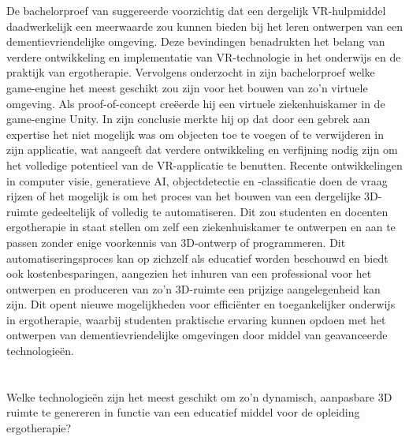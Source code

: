 De bachelorproef van \textcite{Raes2023} suggereerde voorzichtig dat een dergelijk VR-hulpmiddel daadwerkelijk een meerwaarde zou kunnen bieden bij het leren ontwerpen van een dementievriendelijke omgeving. Deze bevindingen benadrukten het belang van verdere ontwikkeling en implementatie van VR-technologie in het onderwijs en de praktijk van ergotherapie.
Vervolgens onderzocht \textcite{Neufkens2023} in zijn bachelorproef welke game-engine het meest geschikt zou zijn voor het bouwen van zo'n virtuele omgeving. Als proof-of-concept creëerde hij een virtuele ziekenhuiskamer in de game-engine Unity. In zijn conclusie merkte hij op dat door een gebrek aan expertise het niet mogelijk was om objecten toe te voegen of te verwijderen in zijn applicatie, wat aangeeft dat verdere ontwikkeling en verfijning nodig zijn om het volledige potentieel van de VR-applicatie te benutten.
Recente ontwikkelingen in computer visie, generatieve AI, objectdetectie en -classificatie doen de vraag rijzen of het mogelijk is om het proces van het bouwen van een dergelijke 3D-ruimte gedeeltelijk of volledig te automatiseren. Dit zou studenten en docenten ergotherapie in staat stellen om zelf een ziekenhuiskamer te ontwerpen en aan te passen zonder enige voorkennis van 3D-ontwerp of programmeren. Dit automatiseringsproces kan op zichzelf als educatief worden beschouwd en biedt ook kostenbesparingen, aangezien het inhuren van een professional voor het ontwerpen en produceren van zo'n 3D-ruimte een prijzige aangelegenheid kan zijn. Dit opent nieuwe mogelijkheden voor efficiënter en toegankelijker onderwijs in ergotherapie, waarbij studenten praktische ervaring kunnen opdoen met het ontwerpen van dementievriendelijke omgevingen door middel van geavanceerde technologieën.


\section{}%
\label{sec:onderzoeksvraag}


Welke technologieën zijn het meest geschikt om zo'n dynamisch, aanpasbare 3D ruimte te genereren in functie van een educatief middel voor de opleiding ergotherapie? 
 
